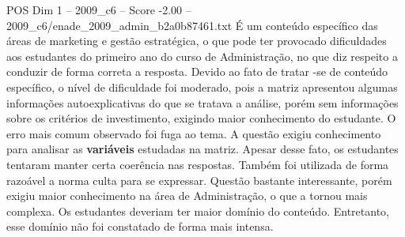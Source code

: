 \begin{textsample}{POS Dim 1 – 2009\_c6 – Score -2.00 – 2009\_c6/enade\_2009\_admin\_b2a0b87461.txt}
É um conteúdo específico das áreas de marketing e gestão estratégica, o que pode ter provocado dificuldades aos estudantes do primeiro ano do curso de Administração, no que diz respeito a conduzir de forma correta a resposta.
Devido ao fato de tratar -se de conteúdo específico, o nível de dificuldade foi moderado, pois a matriz apresentou algumas informações autoexplicativas do que se tratava a análise, porém sem informações sobre os critérios de investimento, exigindo maior conhecimento do estudante.
O erro mais comum observado foi fuga ao tema.
A questão exigiu conhecimento para analisar as \textbf{variáveis} estudadas na matriz.
Apesar desse fato, os estudantes tentaram manter certa coerência nas respostas.
Também foi utilizada de forma razoável a norma culta para se expressar.
Questão bastante interessante, porém exigiu maior conhecimento na área de Administração, o que a tornou mais complexa.
Os estudantes deveriam ter maior domínio do conteúdo.
Entretanto, esse domínio não foi constatado de forma mais intensa.

\end{textsample}
